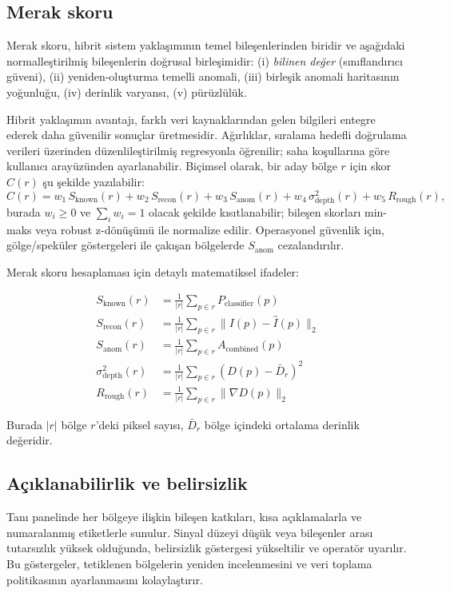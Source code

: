 \documentclass[12pt]{article}
\begin{document}
\subsection{Merak skoru}
Merak skoru, hibrit sistem yaklaşımının temel bileşenlerinden biridir ve aşağıdaki normalleştirilmiş bileşenlerin doğrusal birleşimidir: (i) \emph{bilinen değer} (sınıflandırıcı güveni), (ii) yeniden-oluşturma temelli anomali, (iii) birleşik anomali haritasının yoğunluğu, (iv) derinlik varyansı, (v) pürüzlülük. 

Hibrit yaklaşımın avantajı, farklı veri kaynaklarından gelen bilgileri entegre ederek daha güvenilir sonuçlar üretmesidir. Ağırlıklar, sıralama hedefli doğrulama verileri üzerinden düzenlileştirilmiş regresyonla öğrenilir; saha koşullarına göre kullanıcı arayüzünden ayarlanabilir. Biçimsel olarak, bir aday bölge \(r\) için skor \(C(r)\) şu şekilde yazılabilir:
\[ C(r) = w_1 \, S_{\text{known}}(r) + w_2 \, S_{\text{recon}}(r) + w_3 \, S_{\text{anom}}(r) + w_4 \, \sigma^2_{\text{depth}}(r) + w_5 \, R_{\text{rough}}(r), \]
burada \(w_i \ge 0\) ve \(\sum_i w_i = 1\) olacak şekilde kısıtlanabilir; bileşen skorları min-maks veya robust z-dönüşümü ile normalize edilir. Operasyonel güvenlik için, gölge/speküler göstergeleri ile çakışan bölgelerde \(S_{\text{anom}}\) cezalandırılır.

Merak skoru hesaplaması için detaylı matematiksel ifadeler:

\begin{align}
S_{\text{known}}(r) &= \frac{1}{|r|} \sum_{p \in r} P_{\text{classifier}}(p) \\
S_{\text{recon}}(r) &= \frac{1}{|r|} \sum_{p \in r} \|I(p) - \hat{I}(p)\|_2 \\
S_{\text{anom}}(r) &= \frac{1}{|r|} \sum_{p \in r} A_{\text{combined}}(p) \\
\sigma^2_{\text{depth}}(r) &= \frac{1}{|r|} \sum_{p \in r} (D(p) - \bar{D}_r)^2 \\
R_{\text{rough}}(r) &= \frac{1}{|r|} \sum_{p \in r} \|\nabla D(p)\|_2
\end{align}

Burada \(|r|\) bölge \(r\)'deki piksel sayısı, \(\bar{D}_r\) bölge içindeki ortalama derinlik değeridir.

\subsection{Açıklanabilirlik ve belirsizlik}
Tanı panelinde her bölgeye ilişkin bileşen katkıları, kısa açıklamalarla ve numaralanmış etiketlerle sunulur. Sinyal düzeyi düşük veya bileşenler arası tutarsızlık yüksek olduğunda, belirsizlik göstergesi yükseltilir ve operatör uyarılır. Bu göstergeler, tetiklenen bölgelerin yeniden incelenmesini ve veri toplama politikasının ayarlanmasını kolaylaştırır.
\end{document}
